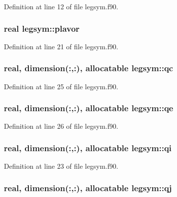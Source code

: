 \-Definition at line 12 of file legsym.\-f90.

\hypertarget{classlegsym_adb777017fc0833c5be3bbe40fb789d9f}{
\subsubsection[{plavor}]{\setlength{\rightskip}{0pt plus 5cm}real {\bf legsym\-::plavor}}}
\label{classlegsym_adb777017fc0833c5be3bbe40fb789d9f}


\-Definition at line 21 of file legsym.\-f90.

\hypertarget{classlegsym_a8da266cccc13b41ffb15d593f3cfbda1}{
\subsubsection[{qc}]{\setlength{\rightskip}{0pt plus 5cm}real, dimension(\-:,\-:), allocatable {\bf legsym\-::qc}}}
\label{classlegsym_a8da266cccc13b41ffb15d593f3cfbda1}


\-Definition at line 25 of file legsym.\-f90.

\hypertarget{classlegsym_a27a404e273f903a7a9fa790dd2440605}{
\subsubsection[{qe}]{\setlength{\rightskip}{0pt plus 5cm}real, dimension(\-:,\-:), allocatable {\bf legsym\-::qe}}}
\label{classlegsym_a27a404e273f903a7a9fa790dd2440605}


\-Definition at line 26 of file legsym.\-f90.

\hypertarget{classlegsym_a35897a5a32d0ac4f7193e2c6df059430}{
\subsubsection[{qi}]{\setlength{\rightskip}{0pt plus 5cm}real, dimension(\-:,\-:), allocatable {\bf legsym\-::qi}}}
\label{classlegsym_a35897a5a32d0ac4f7193e2c6df059430}


\-Definition at line 23 of file legsym.\-f90.

\hypertarget{classlegsym_a3fd3514e19855e9c94debeb13d1c0a3c}{
\subsubsection[{qj}]{\setlength{\rightskip}{0pt plus 5cm}real, dimension(\-:,\-:), allocatable {\bf legsym\-::qj}}}
\label{classlegsym_a3fd3514e19855e9c94debeb13d1c0a3c}


